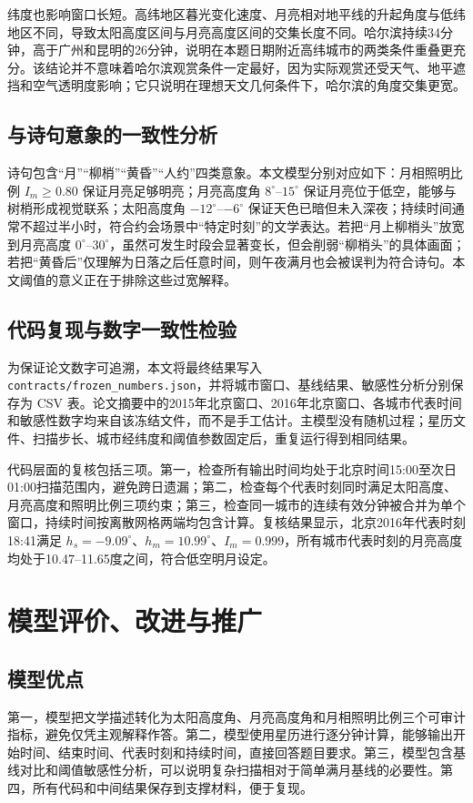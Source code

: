 \documentclass[UTF8,a4paper,12pt]{ctexart}
\begin{document}
纬度也影响窗口长短。高纬地区暮光变化速度、月亮相对地平线的升起角度与低纬地区不同，导致太阳高度区间与月亮高度区间的交集长度不同。哈尔滨持续34分钟，高于广州和昆明的26分钟，说明在本题日期附近高纬城市的两类条件重叠更充分。该结论并不意味着哈尔滨观赏条件一定最好，因为实际观赏还受天气、地平遮挡和空气透明度影响；它只说明在理想天文几何条件下，哈尔滨的角度交集更宽。

\subsection{与诗句意象的一致性分析}
诗句包含“月”“柳梢”“黄昏”“人约”四类意象。本文模型分别对应如下：月相照明比例 $I_m\ge0.80$ 保证月亮足够明亮；月亮高度角 $8^\circ$--$15^\circ$ 保证月亮位于低空，能够与树梢形成视觉联系；太阳高度角 $-12^\circ$--$-6^\circ$ 保证天色已暗但未入深夜；持续时间通常不超过半小时，符合约会场景中“特定时刻”的文学表达。若把“月上柳梢头”放宽到月亮高度 $0^\circ$--$30^\circ$，虽然可发生时段会显著变长，但会削弱“柳梢头”的具体画面；若把“黄昏后”仅理解为日落之后任意时间，则午夜满月也会被误判为符合诗句。本文阈值的意义正在于排除这些过宽解释。

\subsection{代码复现与数字一致性检验}
为保证论文数字可追溯，本文将最终结果写入 \texttt{contracts/frozen\_numbers.json}，并将城市窗口、基线结果、敏感性分析分别保存为 CSV 表。论文摘要中的2015年北京窗口、2016年北京窗口、各城市代表时间和敏感性数字均来自该冻结文件，而不是手工估计。主模型没有随机过程；星历文件、扫描步长、城市经纬度和阈值参数固定后，重复运行得到相同结果。

代码层面的复核包括三项。第一，检查所有输出时间均处于北京时间15:00至次日01:00扫描范围内，避免跨日遗漏；第二，检查每个代表时刻同时满足太阳高度、月亮高度和照明比例三项约束；第三，检查同一城市的连续有效分钟被合并为单个窗口，持续时间按离散网格两端均包含计算。复核结果显示，北京2016年代表时刻18:41满足 $h_s=-9.09^\circ$、$h_m=10.99^\circ$、$I_m=0.999$，所有城市代表时刻的月亮高度均处于10.47--11.65度之间，符合低空明月设定。

\section{模型评价、改进与推广}
\subsection{模型优点}
第一，模型把文学描述转化为太阳高度角、月亮高度角和月相照明比例三个可审计指标，避免仅凭主观解释作答。第二，模型使用星历进行逐分钟计算，能够输出开始时间、结束时间、代表时刻和持续时间，直接回答题目要求。第三，模型包含基线对比和阈值敏感性分析，可以说明复杂扫描相对于简单满月基线的必要性。第四，所有代码和中间结果保存到支撑材料，便于复现。
\end{document}
